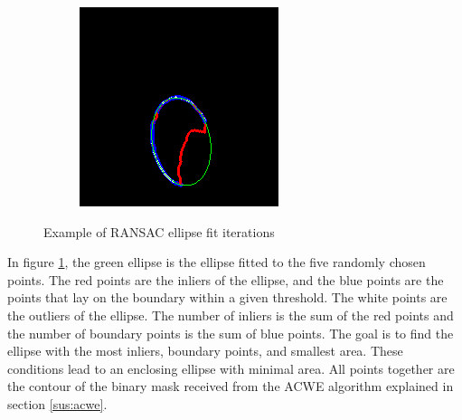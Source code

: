 \begin{figure}[h]
\begin{subfigure}{0.3\textwidth}
    \end{subfigure}%
    \hfill
    \begin{subfigure}{0.3\textwidth}
        \centering
        \includegraphics[width=0.9\linewidth]{plots/ransac/test_mask112.png}

    \end{subfigure}%
    \caption{Example of RANSAC ellipse fit iterations}
    \label{fig:RANSAC_it}
\end{figure}

In figure \ref{fig:RANSAC_it}, the green ellipse is the ellipse fitted to the five randomly chosen points. The red points are the inliers of the ellipse, and the blue points are the points that lay on the boundary within a given threshold. The white points are the outliers of the ellipse. The number of inliers is the sum of the red points and the number of boundary points is the sum of blue points. The goal is to find the ellipse with the most inliers, boundary points, and smallest area. These conditions lead to an enclosing ellipse with minimal area. All points together are the contour of the binary mask received from the ACWE algorithm explained in section \ref{sus:acwe}.
\newpage
